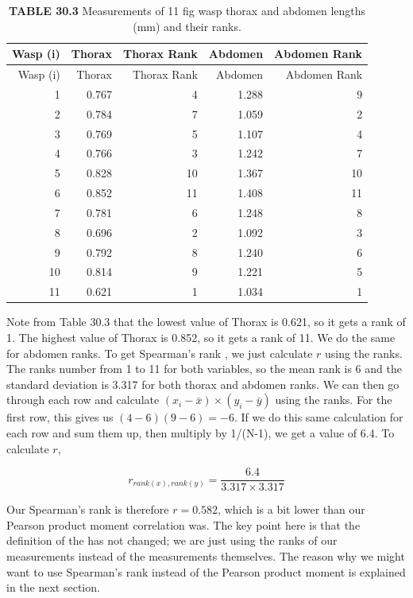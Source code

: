 \documentclass[
  openany]{krantz}
\begin{document}
\begin{longtable}[]{@{}rrrrr@{}}
\caption{\label{tab:unnamed-chunk-131}\textbf{TABLE 30.3} Measurements of 11 fig wasp thorax and abdomen lengths (mm) and their ranks.}\tabularnewline
\toprule
Wasp (i) & Thorax & Thorax Rank & Abdomen & Abdomen Rank \\
\midrule
\endfirsthead
\toprule
Wasp (i) & Thorax & Thorax Rank & Abdomen & Abdomen Rank \\
\midrule
\endhead
1 & 0.767 & 4 & 1.288 & 9 \\
2 & 0.784 & 7 & 1.059 & 2 \\
3 & 0.769 & 5 & 1.107 & 4 \\
4 & 0.766 & 3 & 1.242 & 7 \\
5 & 0.828 & 10 & 1.367 & 10 \\
6 & 0.852 & 11 & 1.408 & 11 \\
7 & 0.781 & 6 & 1.248 & 8 \\
8 & 0.696 & 2 & 1.092 & 3 \\
9 & 0.792 & 8 & 1.240 & 6 \\
10 & 0.814 & 9 & 1.221 & 5 \\
11 & 0.621 & 1 & 1.034 & 1 \\
\bottomrule
\end{longtable}

Note from Table 30.3 that the lowest value of Thorax is 0.621, so it gets a rank of 1.
The highest value of Thorax is 0.852, so it gets a rank of 11.
We do the same for abdomen ranks.
To get Spearman's rank , we just calculate \(r\) using the ranks.
The ranks number from 1 to 11 for both variables, so the mean rank is 6 and the standard deviation is 3.317 for both thorax and abdomen ranks.
We can then go through each row and calculate \(\left(x_{i} - \bar{x} \right) \times \left(y_{i} - \bar{y} \right)\) using the ranks.
For the first row, this gives us \(\left(4 - 6 \right) \left(9 - 6 \right) = -6\).
If we do this same calculation for each row and sum them up, then multiply by 1/(N-1), we get a value of 6.4.
To calculate \(r\),

\[r_{rank(x),rank(y)} = \frac{6.4}{3.317 \times 3.317}\]

Our Spearman's rank  is therefore \(r = 0.582\), which is a bit lower than our Pearson product moment correlation was.
The key point here is that the definition of the  has not changed; we are just using the ranks of our measurements instead of the measurements themselves.
The reason why we might want to use Spearman's rank  instead of the Pearson product moment  is explained in the next section.
\end{document}
